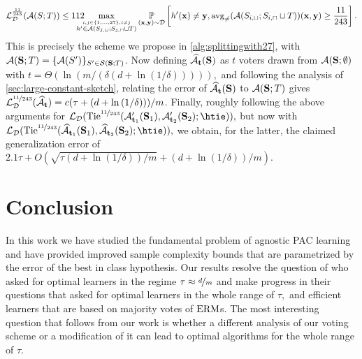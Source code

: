 \begin{align*}
    \operatorname{\mathcal{L}}_{\mathcal{D}}^{\frac{11}{243}} (\mathcal{A}(S;T))
    \leq 112\negmedspace\negmedspace\negmedspace\negmedspace\negmedspace \max_{\stackrel{i,j\in \{1,\ldots,27  \}, i\not=j}{h'\in \mathcal{A}(S_{j,\sqcup};S_{j,\sqcap}\sqcup T)}}\operatorname*{\mathbb{P}}_{(\mathbf{x},\mathbf{y})\sim\mathcal{D}}\left[h'(\mathbf{x})\not=\mathbf{y},\operatorname{\mathrm{avg}_{\not=}}(\mathcal{A}(S_{i,\sqcup}; S_{i,\sqcap}\sqcup T))(\mathbf{x},\mathbf{y}) \geq \frac{11}{243}\right].
\end{align*}
This is precisely the scheme we propose in \cref{alg:splittingwith27}, with $\mathcal{A}(\mathbf{S};T)=\{\mathcal{A}(S')\}_{S'\in \mathcal{S}(\mathbf{S};T)}$. Now defining $ \widehat{\mathcal{A}}_{\mathbf{t}}(\mathbf{S}) $ as $t$ voters drawn from $\mathcal{A}(\mathbf{S};\emptyset)$  with $t=\Theta(\ln{\left(m/(\delta(d+\ln{\left(1/\delta \right)})) \right)}),$ and following the analysis of \cref{sec:large-constant-sketch}, relating the error of $ \widehat{\mathcal{A}}_{\mathbf{t}}(\mathbf{S}) $ to $ \mathcal{A}(\mathbf{S};T) $  gives $ \operatorname{\mathcal{L}}_{\mathcal{D}}^{\nicefrac{11}{243}}(\widehat{\mathcal{A}}_{\mathbf{t}})=c(\tau+(d+\ln{\left(1/\delta \right)}))/m $. Finally, roughly following the above arguments for $\ls_{\cD}(\tie^{\nicefrac{11}{243}}(\cA_{\rt_{1}}'(\rS_{1}),\cA'_{\rt_{2}}(\rS_{2}); \htie )),$ but now with $\ls_{\cD}(\tie^{\nicefrac{11}{243}}(\widehat{\cA}_{\rt_{1}}(\rS_{1}),\widehat{\cA}_{\rt_{2}}(\rS_{2}); \htie )),$ we obtain, for the latter, the claimed generalization error of $ 2.1\tau+O(\sqrt{\tau(d+\ln{\left(1/\delta \right)})/m}+(d+\ln{\left(1/\delta \right)})/m).$ 

\vspace{-0.4 cm}
\section{Conclusion}
In this work we have studied the fundamental problem of agnostic PAC learning and have provided
improved sample complexity bounds that are parametrized by the error of the best in class hypothesis.
Our results resolve the question of \citet{hanneke2024revisiting} who asked for optimal
learners in the regime $\tau \approx \nicefrac{d}{m}$ and make progress in their questions
that asked for optimal learners in the whole range of $\tau,$ and efficient learners
that are based on majority votes of $\mathrm{ERM}$s. The most interesting question that follows from our work
is whether a different analysis of our voting scheme or a modification of it
can lead to optimal algorithms for the whole range of $\tau.$
\vspace{-0.4 cm}

